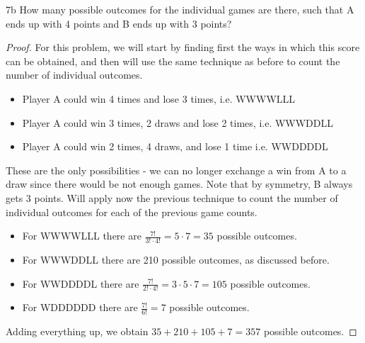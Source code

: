 \begin{exercise}{7b}
How many possible outcomes for the individual games are there, such that A ends
up with 4 points and B ends up with 3 points?
\end{exercise}


\begin{proof}

For this problem, we will start by finding first the ways in which this score can be obtained, and then will use the same technique as before to count the number of individual outcomes.

\begin{itemize}
    \item Player A could win 4 times and lose 3 times, i.e. WWWWLLL
    \item Player A could win 3 times, 2 draws and lose 2 times, i.e. WWWDDLL
    \item Player A could win 2 times, 4 draws, and lose 1 time i.e. WWDDDDL
\end{itemize}

These are the only possibilities - we can no longer exchange a win from A to a draw since there would be not enough games. Note that by symmetry, B always gets 3 points.
Will apply now the previous technique to count the number of individual outcomes for each of the previous game counts.

\begin{itemize}
    \item For WWWWLLL there are $\frac{7!}{3!\cdot 4!} = 5 \cdot 7 = 35$ possible outcomes.
    \item For WWWDDLL there are 210 possible outcomes, as discussed before.
    \item For WWDDDDL there are $\frac{7!}{2!\cdot 4!} = 3 \cdot 5 \cdot 7 = 105$ possible outcomes.
    \item For WDDDDDD there are $\frac{7!}{6!} = 7$ possible outcomes.
\end{itemize}

Adding everything up, we obtain $35+210+105+7=357$ possible outcomes.

    
\end{proof}

